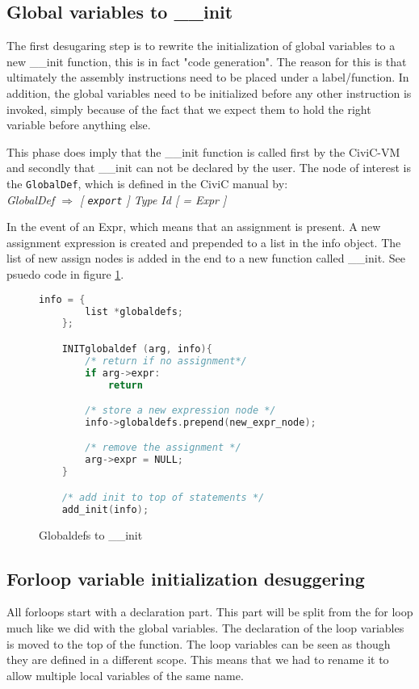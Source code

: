 \documentclass[a4paper]{article}
\begin{document}
\subsection{Global variables to \_\_init}
The first desugaring step is to rewrite the initialization of global variables
to a new \_\_init function, this is in fact "code generation". The reason for
this is that ultimately the assembly instructions need to be placed under a
label/function. In addition, the global variables need to be initialized before any
other instruction is invoked, simply because of the fact that we expect them to
hold the right variable before anything else.

This phase does imply that the \_\_init function is called first by the
CiviC-VM and secondly that \_\_init can not be declared by the user.
The node of interest is the \texttt{GlobalDef}, which is defined in the CiviC
manual by:\\
\textit{GlobalDef $\Rightarrow$ [ \texttt{export} ] Type Id [ = Expr ]}

In the event of an Expr, which means that an assignment is present. A new
assignment expression is created and prepended to a list in the info object.
The list of new assign nodes is added in the end to a new function called
\_\_init. See psuedo code in figure \ref{fig:init}.

\begin{figure}[h]
    \begin{lstlisting}[language=C]
    info = {
        list *globaldefs;
    };

    INITglobaldef (arg, info){
        /* return if no assignment*/
        if arg->expr:
            return

        /* store a new expression node */
        info->globaldefs.prepend(new_expr_node);

        /* remove the assignment */
        arg->expr = NULL;
    }

    /* add init to top of statements */
    add_init(info);
    \end{lstlisting}
    \caption{Globaldefs to \_\_init}
    \label{fig:init}
\end{figure}

\subsection{Forloop variable initialization desuggering}
All forloops start with a declaration part. This part will be split from the
for loop much like we did with the global variables. The declaration of the
loop variables is moved to the top of the function. The loop variables can be
seen as though they are defined in a different scope. This means that we had to
rename it to allow multiple local variables of the same name.
\end{document}
